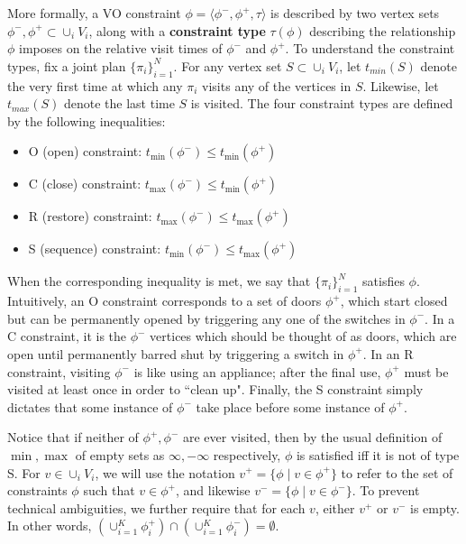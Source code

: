 \documentclass[letterpaper]{article}
\begin{document}
More formally, a VO constraint $\phi = \langle\phi^-,\phi^+,\tau\rangle$ is described by two vertex sets $\phi^-,\phi^+\subset \cup_i V_i$, along with a \textbf{constraint type} $\tau(\phi)$ describing the relationship $\phi$ imposes on the relative visit times of $\phi^-$ and $\phi^+$. To understand the constraint types, fix a joint plan $\{\pi_i\}_{i=1}^N$. For any vertex set $S \subset \cup_i V_i$, let $t_{min}(S)$ denote the very first time at which any $\pi_i$ visits any of the vertices in $S$. Likewise, let $t_{max}(S)$ denote the last time $S$ is visited. The four constraint types are defined by the following inequalities:

\begin{itemize}
\item O (open) constraint: $t_{\min}(\phi^-) \le t_{\min}(\phi^+)$
\item C (close) constraint: $t_{\max}(\phi^-) \le t_{\min}(\phi^+)$
\item R (restore) constraint: $t_{\max}(\phi^-) \le t_{\max}(\phi^+)$
\item S (sequence) constraint: $t_{\min}(\phi^-) \le t_{\max}(\phi^+)$
\end{itemize}

When the corresponding inequality is met, we say that $\{\pi_i\}_{i=1}^N$ satisfies $\phi$. Intuitively, an O constraint corresponds to a set of doors $\phi^+$, which start closed but can be permanently opened by triggering any one of the switches in $\phi^-$. In a C constraint, it is the $\phi^-$ vertices which should be thought of as doors, which are open until permanently barred shut by triggering a switch in $\phi^+$. In an R constraint, visiting $\phi^-$ is like using an appliance; after the final use, $\phi^+$ must be visited at least once in order to ``clean up". Finally, the S constraint simply dictates that some instance of $\phi^-$ take place before some instance of $\phi^+$.

Notice that if neither of $\phi^+,\phi^-$ are ever visited, then by the usual definition of $\min,\max$ of empty sets as $\infty, -\infty$ respectively, $\phi$ is satisfied iff it is not of type S. For $v\in \cup_i V_i$, we will use the notation $v^+ = \{\phi \mid v\in\phi^+\}$ to refer to the set of constraints $\phi$ such that $v\in\phi^+$, and likewise $v^- = \{\phi \mid v\in\phi^-\}$. To prevent technical ambiguities, we further require that for each $v$, either $v^+$ or $v^-$ is empty. In other words, $(\cup_{i=1}^K \phi_i^+) \cap (\cup_{i=1}^K \phi_i^-) = \emptyset$.
\end{document}
